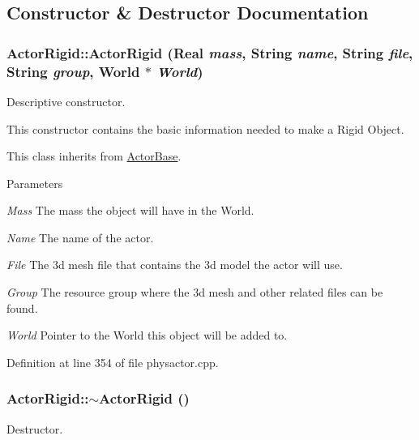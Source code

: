 \subsection{Constructor \& Destructor Documentation}
\hypertarget{classActorRigid_a8a71c343f3872cce605212c0c22e7e14}{
\subsubsection[{ActorRigid}]{\setlength{\rightskip}{0pt plus 5cm}ActorRigid::ActorRigid (Real {\em mass}, \/  String {\em name}, \/  String {\em file}, \/  String {\em group}, \/  {\bf World} $\ast$ {\em World})}}
\label{d5/d10/classActorRigid_a8a71c343f3872cce605212c0c22e7e14}


Descriptive constructor. 

This constructor contains the basic information needed to make a Rigid Object. \par
 This class inherits from \hyperlink{classActorBase}{ActorBase}. 
\begin{DoxyParams}{Parameters}
\item[{\em Mass}]The mass the object will have in the World. \item[{\em Name}]The name of the actor. \item[{\em File}]The 3d mesh file that contains the 3d model the actor will use. \item[{\em Group}]The resource group where the 3d mesh and other related files can be found. \item[{\em World}]Pointer to the World this object will be added to. \end{DoxyParams}


Definition at line 354 of file physactor.cpp.

\hypertarget{classActorRigid_a36b9eb18fc9e83769a48eb1c34312889}{
\subsubsection[{$\sim$ActorRigid}]{\setlength{\rightskip}{0pt plus 5cm}ActorRigid::$\sim$ActorRigid ()}}
\label{d5/d10/classActorRigid_a36b9eb18fc9e83769a48eb1c34312889}


Destructor. 

